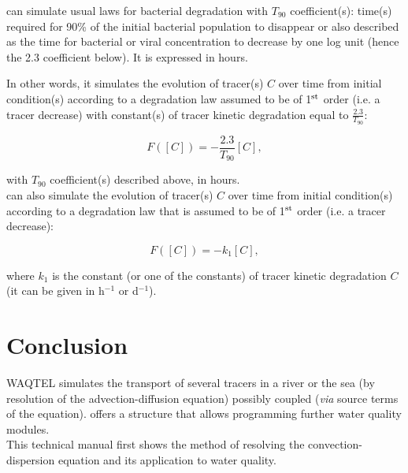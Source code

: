 \documentclass[Waqtel]{../../data/TelemacDoc} %
\begin{document}

\waqtel can simulate usual laws for bacterial degradation with
$T_{90}$ coefficient(s):
time(s) required for 90\% of the initial bacterial population to disappear
or also described as the time for bacterial or viral concentration to decrease
by one log unit (hence the 2.3 coefficient below).
It is expressed in hours.

In other words, it simulates the evolution of tracer(s) $C$ over time from
initial condition(s) according to a degradation law assumed to be of
1$^{\rm{st}}$ order (i.e. a tracer decrease) with constant(s) of tracer kinetic
degradation equal to $\frac{2.3}{T_{90}}$:

\begin{equation}
  F([C]) = -\frac{2.3}{T_{90}} [C],
\end{equation}

with $T_{90}$ coefficient(s) described above, in hours.
\\

\waqtel can also simulate the evolution of tracer(s) $C$ over time
from initial condition(s)
according to a degradation law that is assumed to be of 1$^{\rm{st}}$ order
(i.e. a tracer decrease):

\begin{equation}
  F([C]) = -k_1 [C],
\end{equation}

where $k_1$ is the constant (or one of the constants) of tracer kinetic
degradation $C$ (it can be given in h$^{-1}$ or d$^{-1}$).


\chapter{Conclusion}

WAQTEL simulates the transport of several tracers in a river or the sea
(by resolution of the advection-diffusion equation) possibly coupled
(\textit{via} source terms of the equation).
\waqtel offers a structure that allows programming further water quality modules.\\

This technical manual first shows the method of resolving the convection-dispersion equation
and its application to water quality.\\
\end{document}
